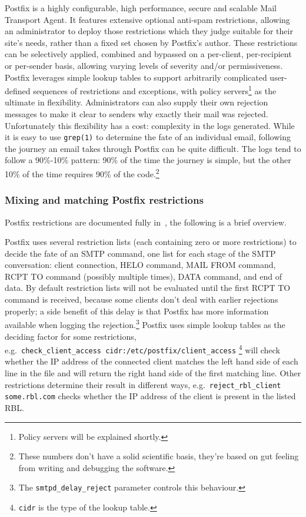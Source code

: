 \documentclass[a4paper,12pt,draft]{article}
\begin{document}
Postfix is a highly configurable, high performance, secure and scalable
Mail Transport Agent.  It features extensive optional anti-spam
restrictions, allowing an administrator to deploy those restrictions which
they judge suitable for their site's needs, rather than a fixed set chosen
by Postfix's author.  These restrictions can be selectively applied,
combined and bypassed on a per-client, per-recipient or per-sender basis,
allowing varying levels of severity and/or permissiveness.  Postfix
leverages simple lookup tables to support arbitrarily complicated
user-defined sequences of restrictions and exceptions, with policy
servers\footnote{Policy servers will be explained shortly.} as the ultimate
in flexibility.  Administrators can also supply their own rejection
messages to make it clear to senders why exactly their mail was rejected.
Unfortunately this flexibility has a cost: complexity in the logs
generated.  While it is easy to use \texttt{grep(1)} to determine the fate
of an individual email, following the journey an email takes through
Postfix can be quite difficult.  The logs tend to follow a 90\%-10\%
pattern: 90\% of the time the journey is simple, but the other 10\% of the
time requires 90\% of the code.\footnote{These numbers don't have a solid
scientific basis, they're based on gut feeling from writing and debugging
the software.}

\subsubsection{Mixing and matching Postfix restrictions}

Postfix restrictions are documented fully in~\cite{smtpd_access_readme,
smtpd_per_user_control, policy-servers}, the following is a brief overview.

Postfix uses several restriction lists (each containing zero or more
restrictions) to decide the fate of an SMTP command, one list for each
stage of the SMTP conversation: client connection, HELO command, MAIL FROM
command, RCPT TO command (possibly multiple times), DATA command, and end
of data.  By default restriction lists will not be evaluated until the
first RCPT TO command is received, because some clients don't deal with
earlier rejections properly; a side benefit of this delay is that Postfix
has more information available when logging the rejection.\footnote{The
\texttt{smtpd\_delay\_reject} parameter controls this behaviour.}  Postfix
uses simple lookup tables as the deciding factor for some restrictions,
e.g.\ \texttt{check\_client\_access~cidr:/etc/postfix/client\_access}
\footnote{\texttt{cidr} is the type of the lookup table.} will check
whether the IP address of the connected client matches the left hand side
of each line in the file and will return the right hand side of the first
matching line.  Other restrictions determine their result in different
ways, e.g.\ \texttt{reject\_rbl\_client some.rbl.com} checks whether the IP
address of the client is present in the listed RBL\@.
\end{document}
